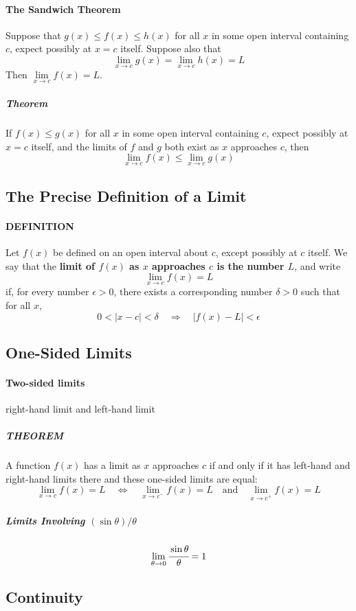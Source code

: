 \documentclass{article}
\begin{document}
                \paragraph{The Sandwich Theorem}
                    Suppose that $g(x)\le f(x) \le h(x)$ for all $x$ in some open interval containing $c$, expect possibly at $x=c$ itself. Suppose also that 
                    \[\lim\limits_{x\to c}g(x)=\lim\limits_{x\to c}h(x)=L\]
                    Then $\lim\limits_{x\to c}f(x)=L$. 
                \subparagraph{Theorem} If $f(x)\le g(x)$ for all $x$ in some open interval containing $c$, expect possibly at $x=c$ itself, and the limits of $f$ and $g$ both exist as $x$ approaches $c$, then
                \[\lim\limits_{x\to c}f(x)\le \lim\limits_{x\to c}g(x)\]
            \subsection{The Precise Definition of a Limit}
                \paragraph{DEFINITION} Let $f(x)$ be defined on an open interval about $c$, except possibly at $c$ itself. We say that the \textbf{limit of $f(x)$ as $x$ approaches $c$ is the number $L$}, and write
                \[\lim\limits_{x\to c}f(x)=L\]
                if, for every number $\epsilon>0$, there exists a corresponding number $\delta>0$ such that for all $x$,
                \[0<\lvert x-c \rvert <\delta \quad \Rightarrow \quad \lvert f(x)-L \rvert <\epsilon\]
            \subsection{One-Sided Limits}
                \paragraph{Two-sided limits}right-hand limit and left-hand limit
                    \subparagraph{THEOREM} A function $f(x)$ has a limit as $x$ approaches $c$ if and only if it has left-hand and right-hand limits there and these one-sided limits are equal:
                    \[\lim\limits_{x\to c}f(x)=L\quad \Leftrightarrow \quad \lim\limits_{x\to c^-}f(x)=L\quad \text{and} \quad \lim\limits_{x\to c^+}f(x)=L\]
                    \subparagraph{Limits Involving $(\sin \theta)/\theta$}
                    \[\lim\limits_{\theta\to 0}\cfrac{\sin\theta}{\theta}=1\]
            \subsection{Continuity}
\end{document}
